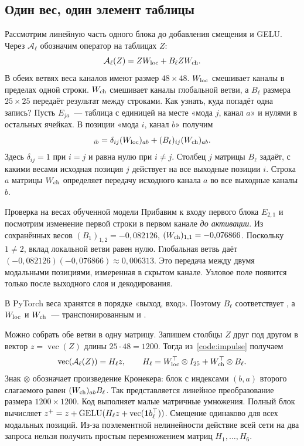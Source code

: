 \clearpage
\subsection{Один вес, один элемент таблицы}
\label{code:matrix-entries}
Рассмотрим линейную часть одного блока до добавления смещения и GELU.
Через $\mathcal A_\ell$ обозначим оператор на таблицах $Z$:
\[
 \mathcal A_\ell(Z)=ZW_{\rm loc}+B_\ell ZW_{\rm ch}.
\]
В обеих ветвях веса каналов имеют размер $48\times48$.
$W_{\rm loc}$ смешивает каналы в пределах одной строки. $W_{\rm ch}$
смешивает каналы глобальной ветви, а $B_\ell$ размера $25\times25$
передаёт результат между строками. Как узнать, куда попадёт одна запись?
Пусть $E_{ja}$~--- таблица с единицей на месте «мода $j$, канал $a$» и
нулями в остальных ячейках. В позиции «мода $i$, канал $b$» получим
\begin{equation}
 [\mathcal A_\ell(E_{ja})]_{ib}
 = \delta_{ij}(W_{\rm loc})_{ab}+(B_\ell)_{ij}(W_{\rm ch})_{ab}.
 \label{code:impulse}
\end{equation}
Здесь $\delta_{ij}=1$ при $i=j$ и равна нулю при $i\ne j$.
Столбец $j$ матрицы $B_\ell$ задаёт, с какими весами исходная позиция $j$
действует на все выходные позиции $i$. Строка $a$ матрицы $W_{\rm ch}$
определяет передачу исходного канала $a$ во все выходные каналы $b$.

\begin{worked}{Проверка на весах обученной модели}
Прибавим к входу первого блока $E_{2,1}$ и посмотрим изменение первой
строки в первом канале \emph{до активации}. Из сохранённых весов
$(B_1)_{1,2}=-0{,}082126$, $(W_{\rm ch})_{1,1}=-0{,}076866$.
Поскольку $1\ne2$, вклад локальной ветви равен нулю. Глобальная
ветвь даёт $(-0{,}082126)(-0{,}076866)\approx0{,}006313$.
Это передача между двумя модальными позициями, измеренная в скрытом канале.
Узловое поле появится только после выходного слоя и декодирования.
\end{worked}

В PyTorch веса хранятся в порядке «выход, вход».
Поэтому $B_\ell$ соответствует , а
$W_{\rm loc}$ и $W_{\rm ch}$~--- транспонированным
 и .

Можно собрать обе ветви в одну матрицу. Запишем столбцы $Z$ друг под
другом в вектор $z=\operatorname{vec}(Z)$ длины $25\cdot48=1200$.
Тогда из~\eqref{code:impulse} получаем
\begin{equation}
 \operatorname{vec}(\mathcal A_\ell(Z))=H_\ell z,\qquad
 H_\ell=W_{\rm loc}^{\top}\otimes I_{25}
            +W_{\rm ch}^{\top}\otimes B_\ell .
 \label{code:kron}
\end{equation}
Знак $\otimes$ обозначает произведение Кронекера: блок с индексами
$(b,a)$ второго слагаемого равен $(W_{\rm ch})_{ab}B_\ell$.
Так представляется линейное преобразование размера $1200\times1200$.
Код выполняет малые матричные умножения. Полный блок вычисляет
$z^+=z+\operatorname{GELU}(H_\ell z+\operatorname{vec}(\bm1 b_\ell^\top))$.
Смещение одинаково для всех модальных позиций. Из-за поэлементной
нелинейности действие всей сети на два запроса нельзя получить
простым перемножением матриц $H_1,\ldots,H_6$.

